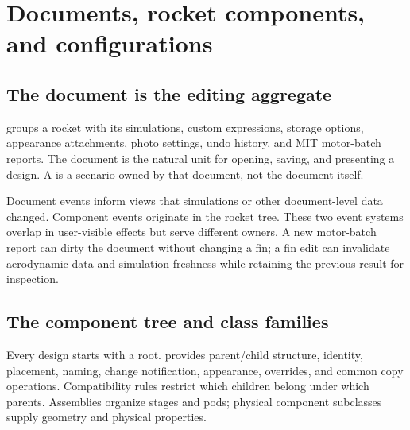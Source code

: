 \chapter{Documents, rocket components, and configurations}\label{ch:components}
\section{The document is the editing aggregate}
 groups a rocket with its simulations, custom expressions, storage options, appearance attachments, photo settings, undo history, and MIT motor-batch reports. The document is the natural unit for opening, saving, and presenting a design. A  is a scenario owned by that document, not the document itself.

Document events inform views that simulations or other document-level data changed. Component events originate in the rocket tree. These two event systems overlap in user-visible effects but serve different owners. A new motor-batch report can dirty the document without changing a fin; a fin edit can invalidate aerodynamic data and simulation freshness while retaining the previous result for inspection.

\section{The component tree and class families}
Every design starts with a  root.  provides parent/child structure, identity, placement, naming, change notification, appearance, overrides, and common copy operations. Compatibility rules restrict which children belong under which parents. Assemblies organize stages and pods; physical component subclasses supply geometry and physical properties.

